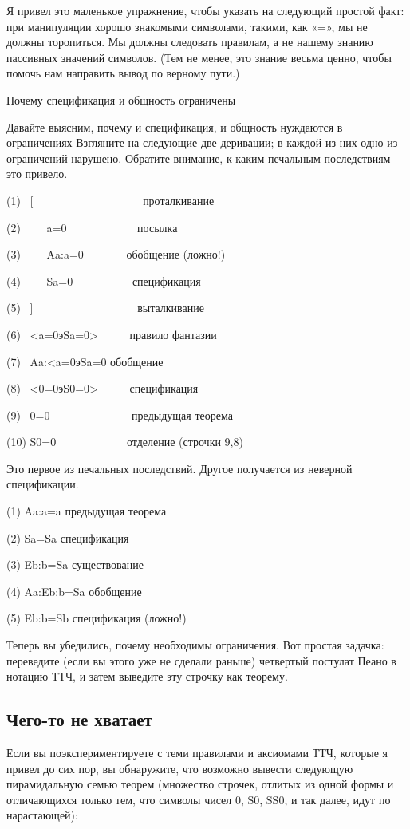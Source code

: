 \documentclass[../main.tex]{subfiles}
\begin{document}
Я привел это маленькое упражнение, чтобы указать на следующий простой факт: при манипуляции хорошо знакомыми символами, такими, как «=», мы не должны торопиться. Мы должны следовать правилам, а не нашему знанию пассивных значений символов. (Тем не менее, это знание весьма ценно, чтобы помочь нам направить вывод по верному пути.)

Почему спецификация и общность ограничены

Давайте выясним, почему и спецификация, и общность нуждаются в ограничениях Взгляните на следующие две деривации; в каждой из них одно из ограничений нарушено. Обратите внимание, к каким печальным последствиям это привело.

(1)~ {[}~~~~~~~~~~~~~~~~~~~ проталкивание

(2)~~~~ a=0~~~~~~~~~~~~ посылка

(3)~~~~ Aa:a=0~~~~~~~ обобщение (ложно!)

(4)~~~~ Sa=0~~~~~~~~~~ спецификация

(5)~ {]}~~~~~~~~~~~~~~~~~~ выталкивание

(6)~ \textless a=0эSa=0\textgreater~~~~~ правило фантазии

(7)~ Aa:\textless a=0эSa=0 обобщение

(8)~ \textless0=0эS0=0\textgreater~~~~~ спецификация

(9)~ 0=0~~~~~~~~~~~~~~ предыдущая теорема

(10) S0=0~~~~~~~~~~~~ отделение (строчки 9,8)

Это первое из печальных последствий. Другое получается из неверной спецификации.

(1) Aa:a=a предыдущая теорема

(2) Sa=Sa спецификация

(3) Eb:b=Sa существование

(4) Aa:Eb:b=Sa обобщение

(5) Eb:b=Sb спецификация (ложно!)

Теперь вы убедились, почему необходимы ограничения. Вот простая задачка: переведите (если вы этого уже не сделали раньше) четвертый постулат Пеано в нотацию ТТЧ, и затем выведите эту строчку как теорему.


\subsection{Чего-то не хватает}

Если вы поэкспериментируете с теми правилами и аксиомами ТТЧ, которые я привел до сих пор, вы обнаружите, что возможно вывести следующую пирамидальную семью теорем (множество строчек, отлитых из одной формы и отличающихся только тем, что символы чисел 0, S0, SS0, и так далее, идут по нарастающей):
\end{document}
